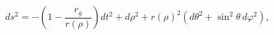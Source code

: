 \begin{equation}
ds^2=-\left(1-\frac{r_g}{r(\rho)}\right)dt^2 +d\rho^2 +r(\rho)^2
(d\theta^2+\sin^2\theta\, d\varphi^2),
\end{equation}

